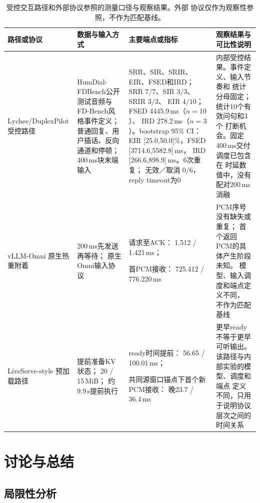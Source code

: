 \documentclass{article}
\begin{document}
\begin{table}[t]
\centering
\caption{受控交互路径和外部协议参照的测量口径与观察结果。外部
协议仅作为观察性参照，不作为匹配基线。}
\label{tab:interaction_protocol}
\scriptsize
\setlength{\tabcolsep}{4pt}
\begin{tabular}{p{}
                p{}
                p{}
                p{}}
\toprule
路径或协议
& 数据与输入方式
& 主要端点或指标
& 观察结果与可比性说明 \\
\midrule

Lychee/DuplexPilot
受控路径
&
HumDial-FDBench公开测试音频与FD-Bench风格事件定义；
普通回复、用户插话、反向通道和停顿；
400\,ms块末端输入
&
SRR、SIR、SRIR、EIR、FSED和IRD；
SRR $7/7$、SIR $3/3$、SRIR $3/3$、
EIR $4/10$；FSED 4445.9\,ms（$n=10$）、
IRD 278.2\,ms（$n=3$）。bootstrap 95\% CI：
EIR [25.0,50.0]\%，FSED [3714.6,5582.8]\,ms，
IRD [266.6,898.9]\,ms。6次重复；
无效／取消 $0/6$，reply timeout为0
&
内部受控结果。事件定义、输入节奏和
统计分母固定；统计10个有效问句和3个
打断机会。固定400\,ms交付调度已包含在
时延数值中，没有配对200\,ms消融 \\

vLLM-Omni
原生热重附着
&
200\,ms先发送再等待；
原生Omni输入协议
&
请求至ACK：
1.512 / 1.421\,ms；

首PCM接收：
725.412 / 776.220\,ms
&
PCM序号没有缺失或重复；
首个返回PCM的具体产生阶段未知。
模型、输入调度和端点定义不同，
不作为匹配基线 \\

LiveServe-style
预加载路径
&
提前准备KV状态；
20 / 15\,MiB；
约9.9\,s提前执行
&
ready时间提前：
56.65 / 100.01\,ms；

共同源窗口锚点下首个新PCM接收：
晚23.7 / 36.4\,ms
&
更早ready不等于更早可听输出。
该路径与内部实验的模型、调度和端点
定义不同，只用于说明协议层次之间的
时间关系 \\
\bottomrule
\end{tabular}
\end{table}

\section{讨论与总结}
\label{sec:discussion_conclusion}

\subsection{局限性分析}
\label{sec:limitations}
\end{document}
